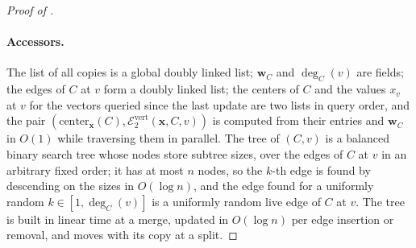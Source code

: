 \documentclass[11pt]{article}
\theoremstyle{remark}
\newcommand{\ww}{\mathbf w}
\newcommand{\xx}{\mathbf x}
\newcommand{\Ecalvert}[1]{\mathcal{E}^{\mathrm{vert}}_{#1}}
\begin{document}
\begin{proof}[Proof of ]
\paragraph{Accessors.}
The list of all copies is a global doubly linked list; $\ww_C$ and
$\deg_C(v)$ are fields; the edges of $C$ at $v$ form a doubly linked list;
the centers of $C$ and the values $x_v$ at $v$ for the vectors queried since
the last update are two lists in query order, and the pair
$(\mathrm{center}_{\xx}(C), \Ecalvert{2}(\xx, C, v))$ is computed from
their entries and $\ww_C$ in $O(1)$ while traversing them in parallel.
The tree of $(C, v)$ is a balanced binary search tree whose nodes store
subtree sizes, over the edges of $C$ at $v$ in an arbitrary fixed order;
it has at most $n$ nodes, so the $k$-th edge is found by descending on the
sizes in $O(\log n)$, and the edge found for a uniformly random
$k \in [1, \deg_C(v)]$ is a uniformly random live edge of $C$ at $v$.
The tree is built in linear time at a merge, updated in $O(\log n)$ per
edge insertion or removal, and moves with its copy at a split.


\end{proof}
\end{document}
